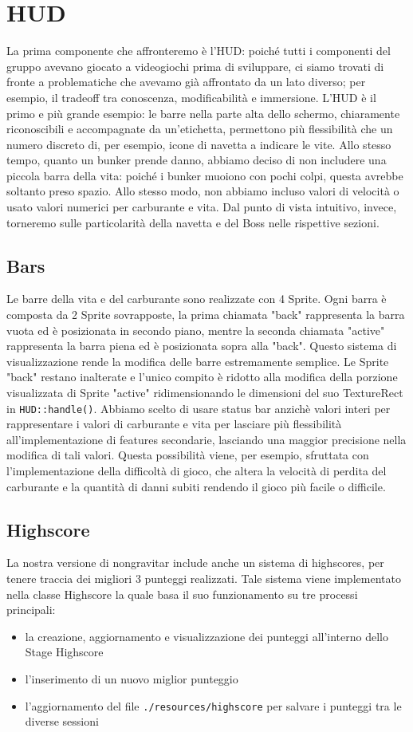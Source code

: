 \documentclass{article}
\begin{document}
\section{HUD}
La prima componente che affronteremo è l'HUD: poiché tutti i componenti del gruppo avevano giocato a videogiochi prima di sviluppare, ci siamo trovati di fronte a problematiche che avevamo già affrontato da un lato diverso; per esempio, il tradeoff tra conoscenza, modificabilità e immersione. L'HUD è il primo e più grande esempio: le barre nella parte alta dello schermo, chiaramente riconoscibili e accompagnate da un'etichetta, permettono più flessibilità che un numero discreto di, per esempio, icone di navetta a indicare le vite. Allo stesso tempo, quanto un bunker prende danno, abbiamo deciso di non includere una piccola barra della vita: poiché i bunker muoiono con pochi colpi, questa avrebbe soltanto preso spazio. Allo stesso modo, non abbiamo incluso valori di velocità o usato valori numerici per carburante e vita. Dal punto di vista intuitivo, invece, torneremo sulle particolarità della navetta e del Boss nelle rispettive sezioni.
\subsection{Bars}
Le barre della vita e del carburante sono realizzate con 4 Sprite. Ogni barra è composta da 2 Sprite sovrapposte, la prima chiamata "back" rappresenta la barra vuota ed è posizionata in secondo piano, mentre la seconda chiamata "active" rappresenta la barra piena ed è posizionata sopra alla "back". Questo sistema di visualizzazione rende la modifica delle barre estremamente semplice.
Le Sprite "back" restano inalterate e l'unico compito è ridotto alla modifica della porzione visualizzata di Sprite "active" ridimensionando le dimensioni del suo TextureRect in \lstinline{HUD::handle()}.
Abbiamo scelto di usare status bar anzichè valori interi per rappresentare i valori di carburante e vita per lasciare più flessibilità all'implementazione di features secondarie, lasciando una maggior precisione nella modifica di tali valori. Questa possibilità viene, per esempio, sfruttata con l'implementazione della difficoltà di gioco, che altera la velocità di perdita del carburante e la quantità di danni subiti rendendo il gioco più facile o difficile.
\subsection{Highscore}
La nostra versione di nongravitar include anche un sistema di highscores, per tenere traccia dei migliori 3 punteggi realizzati. Tale sistema viene implementato nella classe Highscore la quale basa il suo funzionamento su tre processi principali:
\begin{itemize}
  \item la creazione, aggiornamento e visualizzazione dei punteggi all'interno dello Stage Highscore
  \item l'inserimento di un nuovo miglior punteggio
  \item l'aggiornamento del file \lstinline{./resources/highscore} per salvare i punteggi tra le diverse sessioni
\end{itemize}
\end{document}
